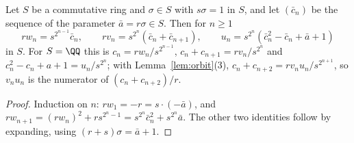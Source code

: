 \begin{lemma}[Reduction]
  \label{lem:reduction}
  \leanok
  Let $S$ be a commutative ring and $\sigma \in S$ with $s \sigma = 1$ in $S$, and let
  $(\bar c_n)$ be the sequence of the parameter $\bar a = r\sigma \in S$. Then for $n \ge 1$
  \[ r w_n = s^{2^{n-1}} \bar c_n, \qquad r v_n = s^{2^n} (\bar c_n + \bar c_{n+1}), \qquad
     u_n = s^{2^n} (\bar c_n^2 - \bar c_n + \bar a + 1) \]
  in $S$. For $S = \QQ$ this is $c_n = r w_n / s^{2^{n-1}}$, $c_n + c_{n+1} = r v_n / s^{2^n}$
  and $c_n^2 - c_n + a + 1 = u_n / s^{2^n}$; with Lemma~\ref{lem:orbit}(3),
  $c_n + c_{n+2} = r v_n u_n / s^{2^{n+1}}$, so $v_n u_n$ is the numerator of
  $(c_n + c_{n+2})/r$.
\end{lemma}
\begin{proof}
  \leanok
  Induction on $n$: $r w_1 = -r = s \cdot (-\bar a)$, and
  $r w_{n+1} = (r w_n)^2 + r s^{2^n - 1} = s^{2^n}\bar c_n^2 + s^{2^n} \bar a$. The other two
  identities follow by expanding, using $(r + s)\sigma = \bar a + 1$.
\end{proof}

